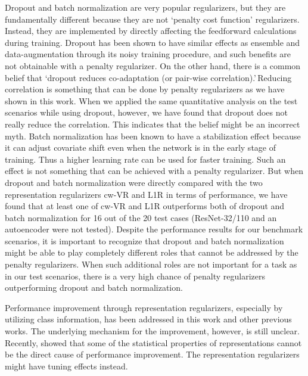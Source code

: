 \documentclass[letterpaper]{article} %
\begin{document}
Dropout and batch normalization are very popular regularizers, but they are fundamentally different because they are not \lq penalty cost function' regularizers. Instead, they are implemented by directly affecting the feedforward calculations during training. Dropout has been shown to have similar effects as ensemble and data-augmentation through its noisy training procedure, and such benefits are not obtainable with a penalty regularizer. On the other hand, there is a common belief that \lq dropout reduces co-adaptation (or pair-wise correlation).\rq \,Reducing correlation is something that can be done by penalty regularizers as we have shown in this work. When we applied the same quantitative analysis on the test scenarios while using dropout, however, we have found that dropout does not really reduce the correlation. This indicates that the belief might be an incorrect myth. 
Batch normalization has been known to have a stabilization effect because it can adjust covariate shift even when the network is in the early stage of training. Thus a higher learning rate can be used for faster training. Such an effect is not something that can be achieved with a penalty regularizer. But when dropout and batch normalization were directly compared with the two representation regularizers cw-VR and L1R in terms of performance, we have found that at least one of cw-VR and L1R outperforms both of dropout and batch normalization for 16 out of the 20 test cases (ResNet-32/110 and an autoencoder were not tested).
Despite the performance results for our benchmark scenarios, it is important to recognize that dropout and batch normalization might be able to play completely different roles that cannot be addressed by the penalty regularizers. When such additional roles are not important for a task as in our test scenarios, there is a very high chance of penalty regularizers outperforming dropout and batch normalization.

Performance improvement through representation regularizers, especially by utilizing class information, has been addressed in this work and other previous works. The underlying mechanism for the improvement, however, is still unclear. Recently, \cite{choi2018statistical} showed that
some of the statistical properties of representations cannot be the direct cause of performance improvement. The representation regularizers might have tuning effects instead. 
\end{document}
